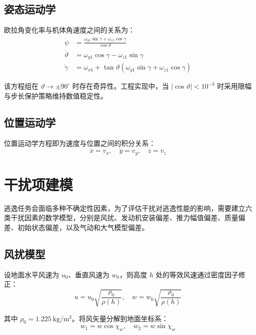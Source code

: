 \subsection{姿态运动学}

欧拉角变化率与机体角速度之间的关系为：
\begin{equation}
\begin{aligned}
\dot\psi &= \frac{\omega_{y1}\sin\gamma+\omega_{z1}\cos\gamma}{\cos\vartheta} \\[4pt]
\dot\vartheta &= \omega_{y1}\cos\gamma-\omega_{z1}\sin\gamma \\[4pt]
\dot\gamma &= \omega_{x1}+\tan\vartheta(\omega_{y1}\sin\gamma+\omega_{z1}\cos\gamma)
\end{aligned}
\end{equation}

该方程组在 $\vartheta\to\pm90^\circ$ 时存在奇异性。工程实现中，当 $|\cos\vartheta|<10^{-3}$ 时采用限幅与步长保护策略维持数值稳定性。

\subsection{位置运动学}

位置运动学方程即为速度与位置之间的积分关系：
\begin{equation}
\dot x=v_x,\quad \dot y=v_y,\quad \dot z=v_z 
\end{equation}

\section{干扰项建模}

逃逸任务会面临多种不确定性因素，为了评估干扰对逃逸性能的影响，需要建立六类干扰因素的数学模型，分别是风扰、发动机安装偏差、推力幅值偏差、质量偏差、初始状态偏差，以及气动和大气模型偏差。

\subsection{风扰模型}

设地面水平风速为 $u_0$、垂直风速为 $w_0$，则高度 $h$ 处的等效风速通过密度因子修正：
\begin{equation}
u=u_0\sqrt{\frac{\rho_0}{\rho(h)}},\quad
w=w_0\sqrt{\frac{\rho_0}{\rho(h)}} 
\end{equation}

其中 $\rho_0=1.225\ \mathrm{kg/m^3}$。将风矢量分解到地面坐标系：
\begin{equation}
w_1=w\cos\chi_w,\quad w_2=w\sin\chi_w 
\end{equation}

